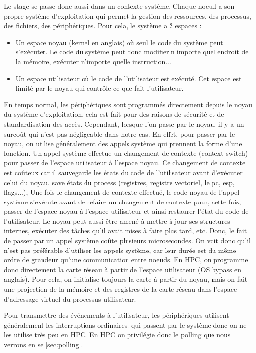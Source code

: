 Le stage se passe donc aussi dans un contexte système.
Chaque noeud a son propre système d'exploitation qui permet la gestion des ressources, des processus, des fichiers, des périphériques.
Pour cela, le système a 2 espaces :
\begin{itemize}
  \item Un espace noyau (kernel en anglais) où seul le code du système peut s'exécuter.
  Le code du système peut donc modifier n'importe quel endroit de la mémoire, exécuter n'importe quelle instruction...
  \item Un espace utilisateur où le code de l'utilisateur est exécuté.
  Cet espace est limité par le noyau qui contrôle ce que fait l'utilisateur.
\end{itemize}

En temps normal, les périphériques sont programmés directement depuis le noyau du système d'exploitation, cela est fait pour des raisons de sécurité et de standardisation des accès.
Cependant, lorsque l'on passe par le noyau, il y a un surcoût qui n'est pas négligeable dans notre cas.
En effet, pour passer par le noyau, on utilise généralement des appels système qui prennent la forme d'une fonction.
Un appel système effectue un changement de contexte (context switch) pour passer de l'espace utilisateur à l'espace noyau.
Ce changement de contexte est coûteux car il sauvegarde les états du code de l'utilisateur avant d'exécuter celui du noyau.
save états du process (registres, registre vectoriel, le pc, esp, flags...),
Une fois le changement de contexte effectué, le code noyau de l'appel système s'exécute avant de refaire un changement de contexte pour, cette fois, passer de l'espace noyau à l'espace utilisateur et ainsi restaurer l'état du code de l'utilisateur.
Le noyau peut aussi être amené à mettre à jour ses structures internes, exécuter des tâches qu'il avait mises à faire plus tard, etc.
Donc, le fait de passer par un appel système coûte plusieurs microsecondes.
On voit donc qu'il n'est pas préférable d'utiliser les appels système, car leur durée est du même ordre de grandeur qu'une communication entre noeuds.
En HPC, on programme donc directement la carte réseau à partir de l'espace utilisateur (OS bypass en anglais).
Pour cela, on initialise toujours la carte à partir du noyau, mais on fait une projection de la mémoire et des registres de la carte réseau dans l'espace d'adressage virtuel du processus utilisateur.

Pour transmettre des événements à l'utilisateur, les périphériques utilisent généralement les interruptions ordinaires, qui passent par le système donc on ne les utilise très peu en HPC.
En HPC on privilégie donc le polling que nous verrons en se \ref{sec:polling}.

